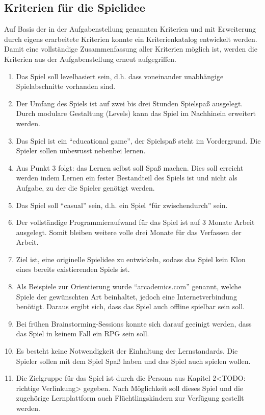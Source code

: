 \subsection{Kriterien für die Spielidee}\label{ssec:kriterien}
	Auf Basis der in der Aufgabenstellung genannten Kriterien und mit Erweiterung durch eigens erarbeitete Kriterien konnte ein Kriterienkatalog entwickelt werden. Damit eine vollständige Zusammenfassung aller Kriterien möglich ist, werden die Kriterien aus der Aufgabenstellung erneut aufgegriffen.
	\begin{enumerate}
		\item{Das Spiel soll levelbasiert sein, d.h. dass voneinander unabhängige Spielabschnitte vorhanden sind.}
		\item{Der Umfang des Spiels ist auf zwei bis drei Stunden Spielspaß ausgelegt. Durch modulare Gestaltung (Levels) kann das Spiel im Nachhinein erweitert werden.}
		\item{Das Spiel ist ein \enquote{educational game}, der Spielspaß steht im Vordergrund. Die Spieler sollen unbewusst nebenbei lernen.}
		\item{Aus Punkt 3 folgt: das Lernen selbst soll Spaß machen. Dies soll erreicht werden indem Lernen ein fester Bestandteil des Spiels ist und nicht als Aufgabe, zu der die Spieler genötigt werden.}
		\item{Das Spiel soll \enquote{casual} sein, d.h. ein Spiel \enquote{für zwischendurch} sein.}
		\item{Der vollständige Programmieraufwand für das Spiel ist auf 3 Monate Arbeit ausgelegt. Somit bleiben weitere volle drei Monate für das Verfassen der Arbeit.}
		\item{Ziel ist, eine originelle Spielidee zu entwickeln, sodass das Spiel kein Klon eines bereits existierenden Spiels ist.}
		\item{Als Beispiele zur Orientierung wurde \enquote{arcademics.com} genannt, welche Spiele der gewünschten Art beinhaltet, jedoch eine Internetverbindung benötigt. Daraus ergibt sich, dass das Spiel auch offline spielbar sein soll.}
		\item{Bei frühen Brainstorming-Sessions konnte sich darauf geeinigt werden, dass das Spiel in keinem Fall ein \gls{RPG} sein soll.}
		\item{Es besteht keine Notwendigkeit der Einhaltung der Lernstandards. Die Spieler sollen mit dem Spiel Spaß haben und das Spiel auch spielen wollen.}
		\item{Die Zielgruppe für das Spiel ist durch die Persona aus Kapitel 2<TODO: richtige Verlinkung> gegeben. Nach Möglichkeit soll dieses Spiel und die zugehörige Lernplattform auch Flüchtlingskindern zur Verfügung gestellt werden.}
	\end{enumerate}

